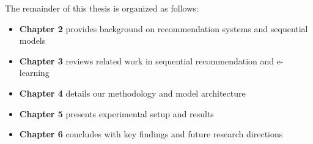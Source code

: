 The remainder of this thesis is organized as follows:

\begin{itemize}
    \item \textbf{Chapter 2} provides background on recommendation systems and sequential models
    \item \textbf{Chapter 3} reviews related work in sequential recommendation and e-learning
    \item \textbf{Chapter 4} details our methodology and model architecture
    \item \textbf{Chapter 5} presents experimental setup and results
    \item \textbf{Chapter 6} concludes with key findings and future research directions
\end{itemize}

\newpage
